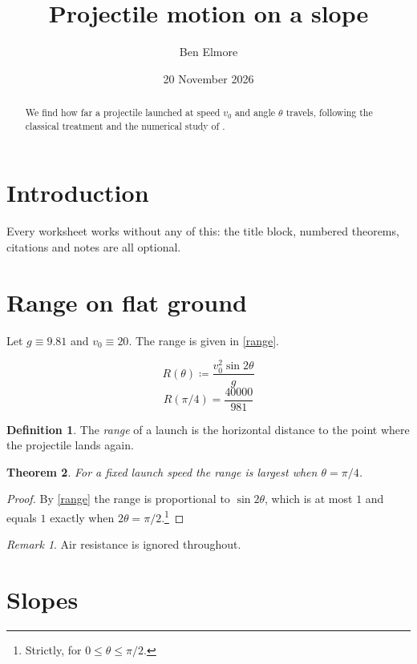 \documentclass[11pt,a4paper]{article}
\theoremstyle{plain}
\newtheorem{theorem}{Theorem}[section]
\theoremstyle{definition}
\newtheorem{definition}[theorem]{Definition}
\theoremstyle{remark}
\newtheorem*{remark}{Remark}
\begin{document}
\title{Projectile motion on a slope}
\author{Ben Elmore}
\date{20 November 2026}
\maketitle
\begin{abstract}
We find how far a projectile launched at speed $v_0$ and angle $\theta$ travels, following the classical treatment \cite{halliday14} and the numerical study of \cite{lee20,knuth84}.
\end{abstract}
\section{Introduction}

Every worksheet works without any of this: the title block, numbered theorems, citations and notes are all optional.

\section{Range on flat ground}

Let $g \equiv 9.81$ and $v_0 \equiv 20$. The range is given in \eqref{range}.

\begin{equation}
  R(\theta) \coloneqq  \frac{v_0^2 \sin 2\theta}{g} \label{range}
\end{equation}
\begin{equation*}
  R(\pi / 4) = \frac{40000}{981}
\end{equation*}
\begin{definition}
The \emph{range} of a launch is the horizontal distance to the point where the projectile lands again.

\end{definition}
\begin{theorem}
For a fixed launch speed the range is largest when $\theta = \pi/4$.

\end{theorem}
\begin{proof}
By \eqref{range} the range is proportional to $\sin 2\theta$, which is at most $1$ and equals $1$ exactly when $2\theta = \pi/2$.\footnote{Strictly, for $0 \le \theta \le \pi/2$.}

\end{proof}
\begin{remark}
Air resistance is ignored throughout.

\end{remark}
\section{Slopes}
\end{document}
